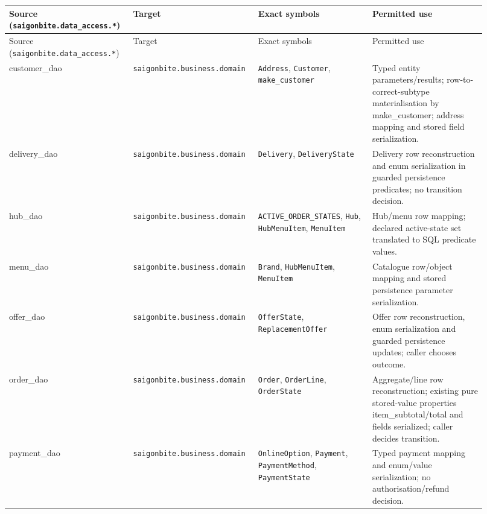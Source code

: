 \begin{longtable}{>{\raggedright\arraybackslash}p{0.2300\linewidth}>{\raggedright\arraybackslash}p{0.2300\linewidth}>{\raggedright\arraybackslash}p{0.2300\linewidth}>{\raggedright\arraybackslash}p{0.2300\linewidth}}
Source (\texttt{saigonbite.\allowbreak{}data\_\allowbreak{}access.\allowbreak{}*}) & Target & Exact symbols & Permitted use \\
\hline\endfirsthead
Source (\texttt{saigonbite.\allowbreak{}data\_\allowbreak{}access.\allowbreak{}*}) & Target & Exact symbols & Permitted use \\
\hline\endhead
customer\_dao & \texttt{saigonbite.\allowbreak{}business.\allowbreak{}domain} & \texttt{Address}, \texttt{Customer}, \texttt{make\_\allowbreak{}customer} & Typed entity parameters/results; row-to-correct-subtype materialisation by make\_customer; address mapping and stored field serialization. \\
delivery\_dao & \texttt{saigonbite.\allowbreak{}business.\allowbreak{}domain} & \texttt{Delivery}, \texttt{DeliveryState} & Delivery row reconstruction and enum serialization in guarded persistence predicates; no transition decision. \\
hub\_dao & \texttt{saigonbite.\allowbreak{}business.\allowbreak{}domain} & \texttt{ACTIVE\_\allowbreak{}ORDER\_\allowbreak{}STATES}, \texttt{Hub}, \texttt{HubMenuItem}, \texttt{MenuItem} & Hub/menu row mapping; declared active-state set translated to SQL predicate values. \\
menu\_dao & \texttt{saigonbite.\allowbreak{}business.\allowbreak{}domain} & \texttt{Brand}, \texttt{HubMenuItem}, \texttt{MenuItem} & Catalogue row/object mapping and stored persistence parameter serialization. \\
offer\_dao & \texttt{saigonbite.\allowbreak{}business.\allowbreak{}domain} & \texttt{OfferState}, \texttt{ReplacementOffer} & Offer row reconstruction, enum serialization and guarded persistence updates; caller chooses outcome. \\
order\_dao & \texttt{saigonbite.\allowbreak{}business.\allowbreak{}domain} & \texttt{Order}, \texttt{OrderLine}, \texttt{OrderState} & Aggregate/line row reconstruction; existing pure stored-value properties item\_subtotal/total and fields serialized; caller decides transition. \\
payment\_dao & \texttt{saigonbite.\allowbreak{}business.\allowbreak{}domain} & \texttt{OnlineOption}, \texttt{Payment}, \texttt{PaymentMethod}, \texttt{PaymentState} & Typed payment mapping and enum/value serialization; no authorisation/refund decision. \\

\end{longtable}
